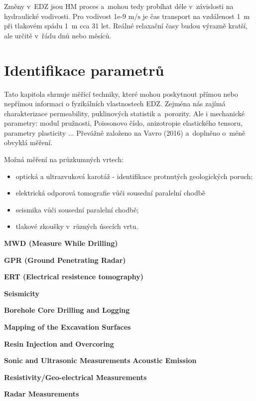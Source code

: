 \documentclass{article}
\begin{document}
Změny v~EDZ jsou HM proces a~mohou tedy probíhat déle v~závislosti na hydraulické vodivosti. Pro vodivost 1e-9 $\mathrm{m/s}$ je čas transport na vzdálenost 1~m při tlakovém spádu 1~m cca 31 let. Reálné relaxační časy budou výrazně kratší, ale určitě v~řádu dnů nebo měsíců. 

\section{Identifikace parametrů}
\label{sec:parameters}

Tato kapitola shrnuje měřící techniky, které mohou poskytnout přímou nebo nepřímou informaci 
o fyzikálních vlastnostech EDZ. Zejména nás zajímá charakterizace permeability, puklinových statistik a~porozity. Ale i mechanické parametry: modul pružnosti, Poissonovo číslo, anizotropie elastického tensoru,  parametry plasticity ...
Převážně založeno na Vavro (2016) \cite{Vavro2016} a~doplněno o~méně obvyklá měření.


Možná měření na průzkumných vrtech:
    \begin{itemize}
        \item optická a ultrazvuková karotáž - identifikace protnutých geologických poruch;
        \item elektrická odporová tomografie vůči sousední paralelní chodbě
        \item seismika vůči sousední paralelní chodbě;
        \item tlakové zkoušky v~různých úsecích vrtu.
    \end{itemize}

{\bf MWD (Measure While Drilling)} \cite{JeroenvanEldert2018}

{\bf GPR (Ground Penetrating Radar)} 

{\bf ERT (Electrical resistence tomography)}


{\bf Seismicity}

{\bf  Borehole Core Drilling and Logging} \cite{Lanyon2011}

{\bf Mapping of the Excavation Surfaces} \cite{Lanyon2011}

{\bf  Resin Injection and Overcoring} \cite{Lanyon2011}

{\bf  Sonic and Ultrasonic Measurements} \cite{Lanyon2011}
{\bf  Acoustic Emission} \cite{Lanyon2011}

{\bf  Resistivity/Geo-electrical Measurements} \cite{Lanyon2011}

{\bf  Radar Measurements} \cite{Lanyon2011}
\end{document}
